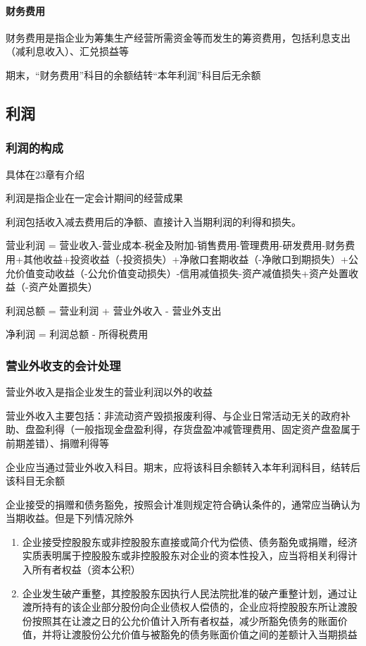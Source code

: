 \documentclass[UTF8,12pt]{ctexart}
\numberwithin{equation}{section} %
\numberwithin{figure}{section}
\numberwithin{table}{section}
\begin{document}
	\paragraph{财务费用}
	财务费用是指企业为筹集生产经营所需资金等而发生的筹资费用，包括利息支出（减利息收入）、汇兑损益等
	
	期末，“财务费用”科目的余额结转“本年利润”科目后无余额
	
	\subsection{利润}
	\subsubsection{利润的构成}
	具体在23章有介绍
	
	利润是指企业在一定会计期间的经营成果
	
	利润包括收入减去费用后的净额、直接计入当期利润的利得和损失。
	
	营业利润 = 营业收入-营业成本-税金及附加-销售费用-管理费用-研发费用-财务费用+其他收益+投资收益（-投资损失）+净敞口套期收益（-净敞口到期损失）+公允价值变动收益（-公允价值变动损失）-信用减值损失-资产减值损失+资产处置收益（-资产处置损失）
	
	利润总额 = 营业利润 + 营业外收入 - 营业外支出
	
	净利润 = 利润总额 - 所得税费用
	
	\subsubsection{营业外收支的会计处理}
	营业外收入是指企业发生的营业利润以外的收益
	
	营业外收入主要包括：非流动资产毁损报废利得、与企业日常活动无关的政府补助、盘盈利得（一般指现金盘盈利得，存货盘盈冲减管理费用、固定资产盘盈属于前期差错）、捐赠利得等
	
	企业应当通过营业外收入科目。期末，应将该科目余额转入本年利润科目，结转后该科目无余额
	
	企业接受的捐赠和债务豁免，按照会计准则规定符合确认条件的，通常应当确认为当期收益。但是下列情况除外
	\begin{enumerate}
		\item 企业接受控股股东或非控股股东直接或简介代为偿债、债务豁免或捐赠，经济实质表明属于控股股东或非控股股东对企业的资本性投入，应当将相关利得计入所有者权益（资本公积）
		
		\item 企业发生破产重整，其控股股东因执行人民法院批准的破产重整计划，通过让渡所持有的该企业部分股份向企业债权人偿债的，企业应将控股股东所让渡股份按照其在让渡之日的公允价值计入所有者权益，减少所豁免债务的账面价值，并将让渡股份公允价值与被豁免的债务账面价值之间的差额计入当期损益
	\end{enumerate}
	
\end{document}
